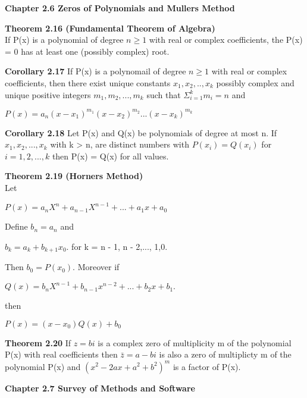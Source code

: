 \documentclass{article}
\begin{document}
\textbf{Chapter 2.6 Zeros of Polynomials and Mullers Method}

\textbf {Theorem 2.16 (Fundamental Theorem of Algebra)} \\
If P(x) is a polynomial of degree $n \geq 1$ with real or complex coefficients, the P(x) = 0 has at least one (possibly complex) root.

\textbf {Corollary 2.17} If P(x) is a polynomail of degree $n \geq 1$ with real or complex coefficients, then there exist unique constants $x_1, x_2,..,x_k$ possibly complex and unique positive integers $m_1,m_2,...,m_k$ such that $\Sigma_{i=1}^{k} m_i = n$ and 
\begin{center}
$P(x) = a_n(x-x_1)^{m_1} (x - x_2)^{m_2}... (x-x_k)^{m_k}$
\end{center}

\textbf {Corollary 2.18} Let P(x) and Q(x) be polynomials of degree at most n. If $x_1, x_2,...,x_k$ with k > n, are distinct numbers with $P(x_i) = Q(x_i)$ for $i = 1,2,...,k$ then P(x) = Q(x) for all values.

\textbf {Theorem 2.19 (Horners Method)} \\ Let
\begin{center}
$P(x) = a_n X^n + a_{n-1} X^{n-1} + ... + a_1 x + a_0$
\end{center}
Define $b_n = a_n$ and 
\begin{center}
$b_k = a_k + b_{k+1} x_0$. for k = n - 1, n - 2,..., 1,0.
\end{center}
Then $b_0 = P(x_0)$. Moreover if
\begin{center}
$Q(x) = b_n X^{n-1} + b_{n-1} x^{n-2} + ... +b_2 x + b_1.$
\end{center}
then
\begin{center}
$P(x) = (x- x_0) Q(x) + b_0$
\end{center}

\textbf {Theorem 2.20} If $z = bi$ is a complex zero of multiplicity m of the polynomial P(x) with real coefficients then $\bar{z} = a - bi$ is also a zero of multiplicty m of the polynomial P(x) and $(x^2 - 2ax + a^2 + b^2)^m$ is a factor of P(x).

\textbf {Chapter 2.7 Survey of Methods and Software}
\end{document}
